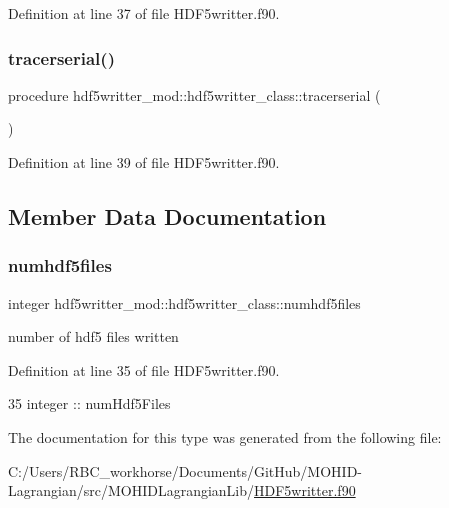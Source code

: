 Definition at line 37 of file H\+D\+F5writter.\+f90.

\mbox{\label{structhdf5writter__mod_1_1hdf5writter__class_ab3c7926065ca07074c5c8f1c809a66d3}} 
\subsubsection{\texorpdfstring{tracerserial()}{tracerserial()}}
{\footnotesize\ttfamily procedure hdf5writter\+\_\+mod\+::hdf5writter\+\_\+class\+::tracerserial (\begin{DoxyParamCaption}{ }\end{DoxyParamCaption})\hspace{0.3cm}{\ttfamily [private]}}



Definition at line 39 of file H\+D\+F5writter.\+f90.



\subsection{Member Data Documentation}
\mbox{\label{structhdf5writter__mod_1_1hdf5writter__class_a8a8b6d09bca45a7e9014638381c76d80}} 
\subsubsection{\texorpdfstring{numhdf5files}{numhdf5files}}
{\footnotesize\ttfamily integer hdf5writter\+\_\+mod\+::hdf5writter\+\_\+class\+::numhdf5files\hspace{0.3cm}{\ttfamily [private]}}



number of hdf5 files written 



Definition at line 35 of file H\+D\+F5writter.\+f90.


\begin{DoxyCode}
35         \textcolor{keywordtype}{integer} :: numHdf5Files
\end{DoxyCode}


The documentation for this type was generated from the following file\+:\begin{DoxyCompactItemize}
\item 
C\+:/\+Users/\+R\+B\+C\+\_\+workhorse/\+Documents/\+Git\+Hub/\+M\+O\+H\+I\+D-\/\+Lagrangian/src/\+M\+O\+H\+I\+D\+Lagrangian\+Lib/\mbox{\hyperlink{_h_d_f5writter_8f90}{H\+D\+F5writter.\+f90}}\end{DoxyCompactItemize}
